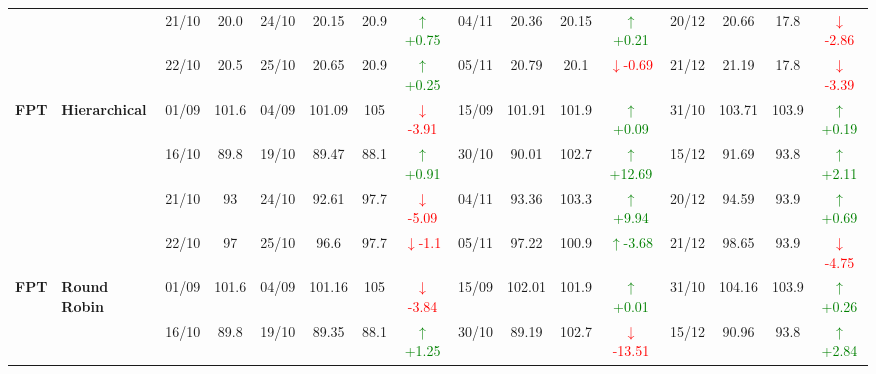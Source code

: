 \documentclass{ieeeaccess}
\begin{document}
{\begin{longtable}{llcc|cccc|cccc|cccc}
&
& 21/10 & 20.0 & 24/10 & 20.15 & 20.9 & \textcolor{green}{\(\uparrow\)+0.75} & 04/11 & 20.36 & 20.15 & \textcolor{green}{\(\uparrow\)+0.21} & 20/12 & 20.66 & 17.8 & \textcolor{red}{\(\downarrow\)-2.86} \\

&
& 22/10 & 20.5 & 25/10 & 20.65 & 20.9 & \textcolor{green}{\(\uparrow\)+0.25} & 05/11 & 20.79 & 20.1 & \textcolor{red}{\(\downarrow\)-0.69} & 21/12 & 21.19 & 17.8 & \textcolor{red}{\(\downarrow\)-3.39} \\
\midrule



\multirow{4}{*}{\textbf{FPT}} 
& \textbf{Hierarchical}
& 01/09 & 101.6 & 04/09 & 101.09 & 105 & \textcolor{red}{\(\downarrow\)-3.91} & 15/09 & 101.91 & 101.9 & \textcolor{green}{\(\uparrow\)+0.09} & 31/10 & 103.71 & 103.9 & \textcolor{green}{\(\uparrow\)+0.19} \\

&
& 16/10 & 89.8 & 19/10 & 89.47 & 88.1 & \textcolor{green}{\(\uparrow\)+0.91} & 30/10 & 90.01 & 102.7 & \textcolor{green}{\(\uparrow\)+12.69} & 15/12 & 91.69 & 93.8 & \textcolor{green}{\(\uparrow\)+2.11} \\

&
& 21/10 & 93 & 24/10 & 92.61 & 97.7 & \textcolor{red}{\(\downarrow\)-5.09} & 04/11 & 93.36 & 103.3 & \textcolor{green}{\(\uparrow\)+9.94} & 20/12 & 94.59 & 93.9 &\textcolor{green}{\(\uparrow\)+0.69}\\

&
& 22/10 & 97 & 25/10 & 96.6 & 97.7 & \textcolor{red}{\(\downarrow\)-1.1} & 05/11 & 97.22 & 100.9 & \textcolor{green}{\(\uparrow\)-3.68} & 21/12 & 98.65 & 93.9 & \textcolor{red}{\(\downarrow\)-4.75} \\
\midrule


\multirow{4}{*}{\textbf{FPT}} 
& \textbf{Round Robin}
& 01/09 & 101.6 & 04/09 & 101.16 & 105 & \textcolor{red}{\(\downarrow\)-3.84} & 15/09 & 102.01 & 101.9 & \textcolor{green}{\(\uparrow\)+0.01} & 31/10 & 104.16 & 103.9 & \textcolor{green}{\(\uparrow\)+0.26} \\

&
& 16/10 & 89.8 & 19/10 & 89.35 & 88.1 & \textcolor{green}{\(\uparrow\)+1.25} & 30/10 & 89.19 & 102.7 & \textcolor{red}{\(\downarrow\)-13.51} & 15/12 & 90.96 & 93.8 & \textcolor{green}{\(\uparrow\)+2.84} \\


\end{longtable}}
\end{document}

